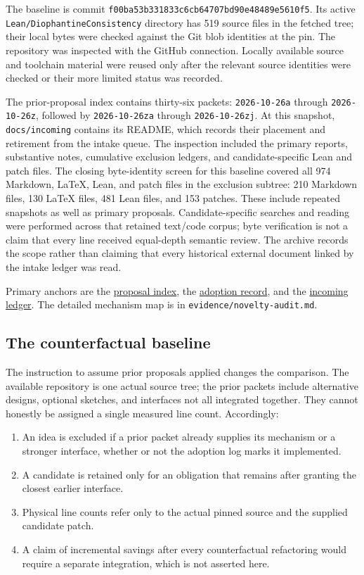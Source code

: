 \documentclass[11pt,letterpaper]{article}
\newcommand{\code}[1]{{\small\urlstyle{tt}\nolinkurl{#1}}}
\newcommand{\pin}{\code{f00ba53b331833c6cb64707bd90e48489e5610f5}}
\newcommand{\source}[2]{\href{https://github.com/VladimirReshetnikov/ProveIt/blob/f00ba53b331833c6cb64707bd90e48489e5610f5/#1}{#2}}
\begin{document}
The baseline is commit \pin. Its active \code{Lean/DiophantineConsistency} directory has 519 source files in the fetched tree; their local bytes were checked against the Git blob identities at the pin. The repository was inspected with the GitHub connection. Locally available source and toolchain material were reused only after the relevant source identities were checked or their more limited status was recorded.

The prior-proposal index contains thirty-six packets: \code{2026-10-26a} through \code{2026-10-26z}, followed by \code{2026-10-26za} through \code{2026-10-26zj}. At this snapshot, \code{docs/incoming} contains its README, which records their placement and retirement from the intake queue. The inspection included the primary reports, substantive notes, cumulative exclusion ledgers, and candidate-specific Lean and patch files. The closing byte-identity screen for this baseline covered all 974 Markdown, LaTeX, Lean, and patch files in the exclusion subtree: 210 Markdown files, 130 LaTeX files, 481 Lean files, and 153 patches. These include repeated snapshots as well as primary proposals. Candidate-specific searches and reading were performed across that retained text/code corpus; byte verification is not a claim that every line received equal-depth semantic review. The archive records the scope rather than claiming that every historical external document linked by the intake ledger was read.

Primary anchors are the \source{Computability/DiophantineConsistency/research/lean-proof-simplification/README.md}{proposal index}, the \source{Computability/DiophantineConsistency/research/lean-proof-simplification/ADOPTION.md}{adoption record}, and the \source{docs/incoming/README.md}{incoming ledger}. The detailed mechanism map is in \code{evidence/novelty-audit.md}.

\subsection{The counterfactual baseline}

The instruction to assume prior proposals applied changes the comparison. The available repository is one actual source tree; the prior packets include alternative designs, optional sketches, and interfaces not all integrated together. They cannot honestly be assigned a single measured line count. Accordingly:

\begin{enumerate}
\item An idea is excluded if a prior packet already supplies its mechanism or a stronger interface, whether or not the adoption log marks it implemented.
\item A candidate is retained only for an obligation that remains after granting the closest earlier interface.
\item Physical line counts refer only to the actual pinned source and the supplied candidate patch.
\item A claim of incremental savings after every counterfactual refactoring would require a separate integration, which is not asserted here.
\end{enumerate}
\end{document}
